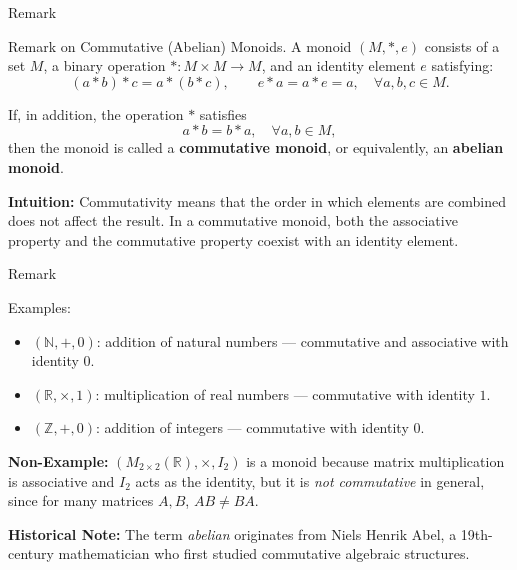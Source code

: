 \documentclass[11pt,aspectratio=43,ignorenonframetext,t]{beamer}
\begin{document}
\begin{frame}{Remark}
\vspace{-0.2cm}
\begin{block}{Remark on Commutative (Abelian) Monoids.}  
A monoid \((M, *, e)\) consists of a set \(M\), a binary operation \(* : M \times M \to M\), and an identity element \(e\) satisfying:
\[
(a * b) * c = a * (b * c), \qquad e * a = a * e = a, \quad \forall a,b,c \in M.
\]

If, in addition, the operation \(*\) satisfies
\[
a * b = b * a, \quad \forall a,b \in M,
\]
then the monoid is called a \textbf{commutative monoid}, or equivalently, an \textbf{abelian monoid}.

\textbf{Intuition:}  
Commutativity means that the order in which elements are combined does not affect the result.  
In a commutative monoid, both the associative property and the commutative property coexist with an identity element.
\end{block}
\end{frame}

\begin{frame}{Remark}
\begin{block}{Examples:}
\begin{itemize}
  \item \((\mathbb{N}, +, 0)\): addition of natural numbers — commutative and associative with identity \(0\).
  \item \((\mathbb{R}, \times, 1)\): multiplication of real numbers — commutative with identity \(1\).
  \item \((\mathbb{Z}, +, 0)\): addition of integers — commutative with identity \(0\).
\end{itemize}

\textbf{Non-Example:}
\((M_{2\times2}(\mathbb{R}), \times, I_2)\) is a monoid because matrix multiplication is associative and \(I_2\) acts as the identity,  
but it is \emph{not commutative} in general, since for many matrices \(A,B\), \(AB \neq BA.\)

\textbf{Historical Note:}  
The term \emph{abelian} originates from Niels Henrik Abel, a 19th-century mathematician who first studied commutative algebraic structures.     
    \end{block}
\end{frame}
\end{document}

